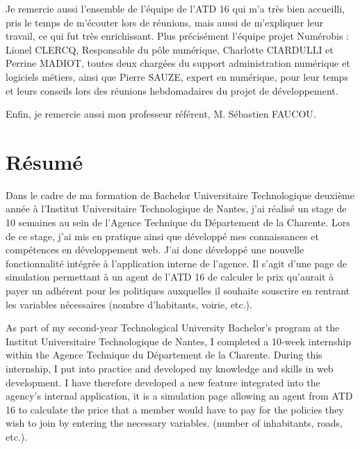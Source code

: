 \documentclass[a4paper,12pt]{report}
\begin{document}
\vspace{1em}

Je remercie aussi l’ensemble de l’équipe de l’ATD 16 qui m’a très bien accueilli, pris le temps de m’écouter lors de réunions, mais aussi de m’expliquer leur travail, ce qui fut très enrichissant. Plus précisément l'équipe projet Numérobis : Lionel CLERCQ, Responsable du pôle numérique, Charlotte CIARDULLI et Perrine MADIOT, toutes deux chargées du support administration numérique et logiciels métiers, ainsi que Pierre SAUZE, expert en numérique, pour leur temps et leurs conseils lors des réunions hebdomadaires du projet de développement.

\vspace{1em}

Enfin, je remercie aussi mon professeur référent, M. Sébastien FAUCOU.

\newpage
\chapter*{Résumé}
\thispagestyle{empty}

Dans le cadre de ma formation de Bachelor Universitaire Technologique deuxième année à l’Institut Universitaire Technologique de Nantes, j’ai réalisé un stage de 10 semaines au sein de l’Agence Technique du Département de la Charente. Lors de ce stage, j’ai mis en pratique ainsi que développé mes connaissances et compétences en développement web. J’ai donc développé une nouvelle fonctionnalité intégrée à l'application interne de l’agence. Il s'agit d'une page de simulation permettant à un agent de l'ATD 16 de calculer le prix qu’aurait à payer un adhérent pour les politiques auxquelles il souhaite souscrire en rentrant les variables nécessaires (nombre d’habitants, voirie, etc.).

\vspace{1em}

As part of my second-year Technological University Bachelor’s program at the Institut Universitaire Technologique de Nantes, I completed a 10-week internship within the Agence Technique du Département de la Charente. During this internship, I put into practice and developed my knowledge and skills in web development. I have therefore developed a new feature integrated into the agency’s internal application, it is a simulation page allowing an agent from ATD 16 to calculate the price that a member would have to pay for the policies they wish to join by entering the necessary variables. (number of inhabitants, roads, etc.).
\end{document}
